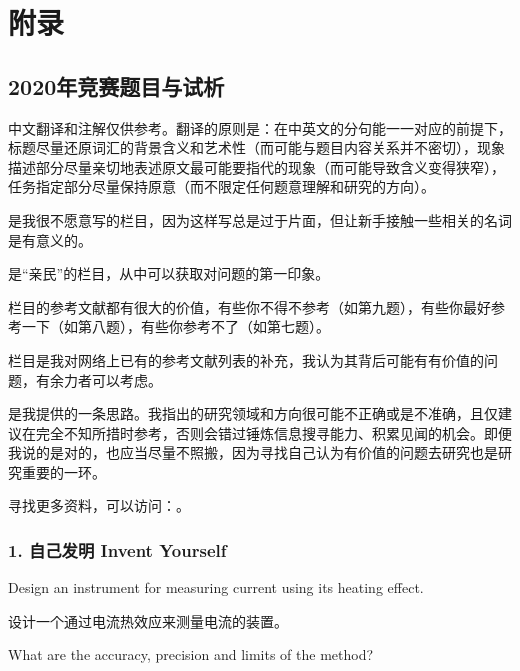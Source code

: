 \documentclass[a4paper,10pt,english]{sphinxmanual}
\begin{document}


\chapter{附录}
\label{\detokenize{7. Appendix:id1}}\label{\detokenize{7. Appendix::doc}}

\section{2020年竞赛题目与试析}
\label{\detokenize{7. Appendix:id2}}
中文翻译和注解仅供参考。翻译的原则是：在中英文的分句能一一对应的前提下，标题尽量还原词汇的背景含义和艺术性（而可能与题目内容关系并不密切），现象描述部分尽量亲切地表述原文最可能要指代的现象（而可能导致含义变得狭窄），任务指定部分尽量保持原意（而不限定任何题意理解和研究的方向）。

 是我很不愿意写的栏目，因为这样写总是过于片面，但让新手接触一些相关的名词是有意义的。

 是“亲民”的栏目，从中可以获取对问题的第一印象。

 栏目的参考文献都有很大的价值，有些你不得不参考（如第九题），有些你最好参考一下（如第八题），有些你参考不了（如第七题）。

 栏目是我对网络上已有的参考文献列表的补充，我认为其背后可能有有价值的问题，有余力者可以考虑。

 是我提供的一条思路。我指出的研究领域和方向很可能不正确或是不准确，且仅建议在完全不知所措时参考，否则会错过锤炼信息搜寻能力、积累见闻的机会。即便我说的是对的，也应当尽量不照搬，因为寻找自己认为有价值的问题去研究也是研究重要的一环。

寻找更多资料，可以访问：。


\subsection{1. 自己发明 Invent Yourself}
\label{\detokenize{7. Appendix:invent-yourself}}
Design an instrument for measuring current using its heating effect.

设计一个通过电流热效应来测量电流的装置。

What are the accuracy, precision and limits of the method?
\end{document}
